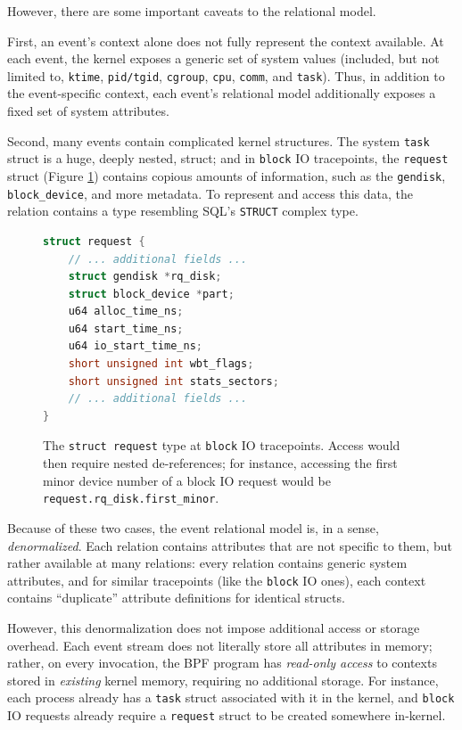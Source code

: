 However, there are some important caveats to the relational model.

First, an event's context alone does not fully represent the context available. At each event, the
kernel exposes a generic set of system values (included, but not limited to, \texttt{ktime},
\texttt{pid/tgid}, \texttt{cgroup}, \texttt{cpu}, \texttt{comm}, and \texttt{task}).  Thus, in
addition to the event-specific context, each event's relational model additionally exposes a fixed
set of system attributes.

Second, many events contain complicated kernel structures. The system \texttt{task} struct is a
huge, deeply nested, struct; and in \texttt{block} IO tracepoints, the \texttt{request} struct
(Figure \ref{code:request-struct}) contains copious amounts of information, such as the
\texttt{gendisk}, \texttt{block\_device}, and more metadata.  To represent and access this data, the
relation contains a type resembling SQL's \texttt{STRUCT} complex type. 

\begin{figure}[htpb]
\begin{lstlisting}[language=C]
struct request {
    // ... additional fields ...  
    struct gendisk *rq_disk;
    struct block_device *part;
    u64 alloc_time_ns;
    u64 start_time_ns;
    u64 io_start_time_ns;
    short unsigned int wbt_flags;
    short unsigned int stats_sectors;
    // ... additional fields ...  
}
\end{lstlisting}
\caption{The \texttt{struct request} type at \texttt{block} IO tracepoints. Access would then
require nested de-references; for instance, accessing the first minor device number of a block IO
request would be \texttt{request.rq\_disk.first\_minor}.}
\label{code:request-struct}
\end{figure}

Because of these two cases, the event relational model is, in a sense, \textit{denormalized}. Each
relation contains attributes that are not specific to them, but rather available at many relations:
every relation contains generic system attributes, and for similar tracepoints (like the
\texttt{block} IO ones), each context contains ``duplicate'' attribute definitions for identical
structs.

However, this denormalization does not impose additional access or storage overhead. Each event
stream does not literally store all attributes in memory; rather, on every invocation, the BPF
program has \textit{read-only access} to contexts stored in \textit{existing} kernel memory,
requiring no additional storage. For instance, each process already has a \texttt{task} struct
associated with it in the kernel, and \texttt{block} IO requests already require a \texttt{request}
struct to be created somewhere in-kernel.


